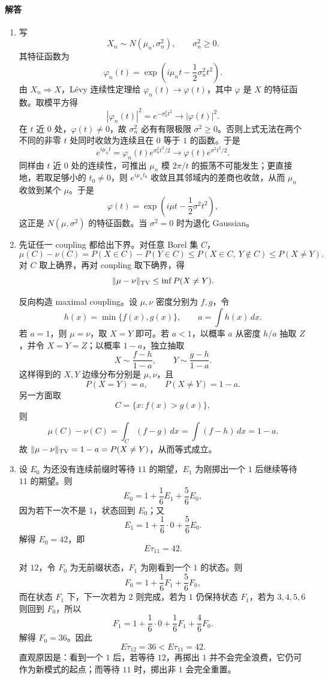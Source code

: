 \documentclass[UTF8,12pt]{ctexart}
\begin{document}
\paragraph{解答}
\begin{enumerate}[label=\textbf{\arabic*.},leftmargin=2.2em]
\item 写
\[
X_n\sim N(\mu_n,\sigma_n^2),\qquad \sigma_n^2\ge0.
\]
其特征函数为
\[
\varphi_n(t)=\exp\left(i\mu_nt-\frac12\sigma_n^2t^2\right).
\]
由 \(X_n\Rightarrow X\)，Lévy 连续性定理给 \(\varphi_n(t)\to\varphi(t)\)，其中 \(\varphi\) 是 \(X\) 的特征函数。取模平方得
\[
|\varphi_n(t)|^2=e^{-\sigma_n^2t^2}\to |\varphi(t)|^2.
\]
在 \(t\) 近 \(0\) 处，\(\varphi(t)\ne0\)，故 \(\sigma_n^2\) 必有有限极限 \(\sigma^2\ge0\)。否则上式无法在两个不同的非零 \(t\) 处同时收敛为连续且在 \(0\) 等于 \(1\) 的函数。于是
\[
e^{i\mu_nt}=\varphi_n(t)e^{\sigma_n^2t^2/2}\to \varphi(t)e^{\sigma^2t^2/2}.
\]
同样由 \(t\) 近 \(0\) 处的连续性，可推出 \(\mu_n\) 模 \(2\pi/t\) 的振荡不可能发生；更直接地，若取足够小的 \(t_0\ne0\)，则 \(e^{i\mu_nt_0}\) 收敛且其邻域内的差商也收敛，从而 \(\mu_n\) 收敛到某个 \(\mu\)。于是
\[
\varphi(t)=\exp\left(i\mu t-\frac12\sigma^2t^2\right),
\]
这正是 \(N(\mu,\sigma^2)\) 的特征函数。当 \(\sigma^2=0\) 时为退化 Gaussian。

\item 先证任一 coupling 都给出下界。对任意 Borel 集 \(C\)，
\[
\mu(C)-\nu(C)=P(X\in C)-P(Y\in C)
\le P(X\in C,\ Y\notin C)\le P(X\ne Y).
\]
对 \(C\) 取上确界，再对 coupling 取下确界，得
\[
\|\mu-\nu\|_{\rm TV}\le \inf P(X\ne Y).
\]

反向构造 maximal coupling。设 \(\mu,\nu\) 密度分别为 \(f,g\)，令
\[
h(x)=\min\{f(x),g(x)\},\qquad a=\int h(x)\,dx.
\]
若 \(a=1\)，则 \(\mu=\nu\)，取 \(X=Y\) 即可。若 \(a<1\)，以概率 \(a\) 从密度 \(h/a\) 抽取 \(Z\)，并令 \(X=Y=Z\)；以概率 \(1-a\)，独立抽取
\[
X\sim \frac{f-h}{1-a},\qquad Y\sim\frac{g-h}{1-a}.
\]
这样得到的 \(X,Y\) 边缘分布分别是 \(\mu,\nu\)，且
\[
P(X=Y)=a,\qquad P(X\ne Y)=1-a.
\]
另一方面取
\[
C=\{x:f(x)>g(x)\},
\]
则
\[
\mu(C)-\nu(C)=\int_C(f-g)\,dx=\int(f-h)\,dx=1-a.
\]
故 \(\|\mu-\nu\|_{\rm TV}=1-a=P(X\ne Y)\)，从而等式成立。

\item 设 \(E_0\) 为还没有连续前缀时等待 \(11\) 的期望，\(E_1\) 为刚掷出一个 \(1\) 后继续等待 \(11\) 的期望。则
\[
E_0=1+\frac16E_1+\frac56E_0,
\]
因为若下一次不是 \(1\)，状态回到 \(E_0\)；又
\[
E_1=1+\frac16\cdot0+\frac56E_0.
\]
解得 \(E_0=42\)，即
\[
E\tau_{11}=42.
\]

对 \(12\)，令 \(F_0\) 为无前缀状态，\(F_1\) 为刚看到一个 \(1\) 的状态。则
\[
F_0=1+\frac16F_1+\frac56F_0,
\]
而在状态 \(F_1\) 下，下一次若为 \(2\) 则完成，若为 \(1\) 仍保持状态 \(F_1\)，若为 \(3,4,5,6\) 则回到 \(F_0\)，所以
\[
F_1=1+\frac16\cdot0+\frac16F_1+\frac46F_0.
\]
解得 \(F_0=36\)。因此
\[
E\tau_{12}=36<E\tau_{11}=42.
\]
直观原因是：看到一个 \(1\) 后，若等待 \(12\)，再掷出 \(1\) 并不会完全浪费，它仍可作为新模式的起点；而等待 \(11\) 时，掷出非 \(1\) 会完全重置。


\end{enumerate}
\end{document}
